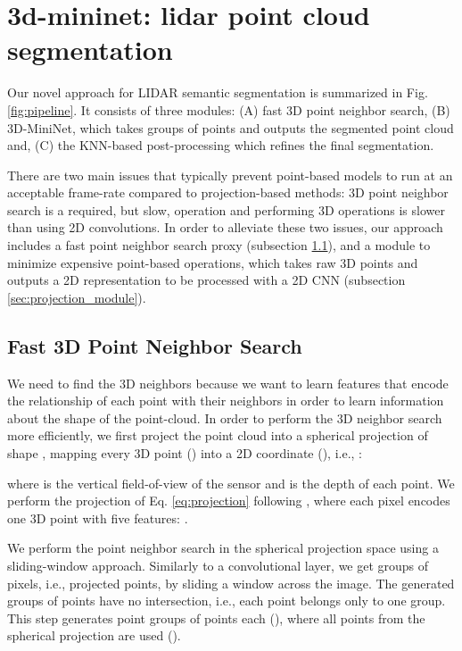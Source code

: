\documentclass[letterpaper, 10 pt, journal, twoside]{IEEEtran}
\begin{document}
 
\section{3d-mininet: lidar point cloud segmentation}
\label{sec:method}

Our novel approach for LIDAR semantic segmentation is summarized in Fig. \ref{fig:pipeline}. It consists of three modules: (A) fast 3D point neighbor search, (B) 3D-MiniNet, which takes  groups of  points and outputs the segmented point cloud and, (C) the KNN-based post-processing which refines the final segmentation. 


There are two main issues that typically prevent point-based models to run at an acceptable frame-rate compared to projection-based methods: 3D point neighbor search is a required, but slow, operation and performing 3D operations is slower than using 2D convolutions. In order to alleviate these two issues, our approach includes a fast point neighbor search proxy (subsection \ref{sec:neighbor_search}), and a module to minimize expensive point-based operations, which takes raw 3D points and outputs a 2D representation to be processed with a 2D CNN (subsection \ref{sec:projection_module}).

\subsection{Fast 3D Point Neighbor Search}
\label{sec:neighbor_search}

We need to find the 3D neighbors because we want to learn features that encode the relationship of each point with their neighbors in order to learn information about the shape of the point-cloud.  
In order to perform the 3D neighbor search more efficiently, we first project 
the point cloud into a spherical projection of shape , mapping every 3D point () into a 2D coordinate (), i.e., :



\noindent where   is the vertical field-of-view of the sensor and  is the depth of each point. We perform the projection of Eq. \ref{eq:projection}  following \cite{milioto2019rangenet++}, where each pixel encodes one 3D point with five features: .


We perform the point neighbor search in the spherical projection space using a sliding-window approach. Similarly to a convolutional layer, we get groups of pixels, i.e., projected points, by sliding a  window across the image. The generated groups of points have no intersection, i.e., each point belongs only to one group. 
This step generates  point groups of  points each (), where all points from the spherical projection are used (). 
\end{document}
